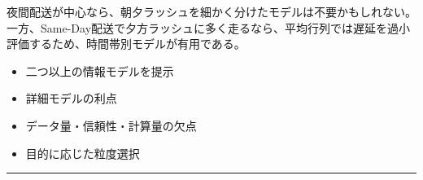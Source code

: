 夜間配送が中心なら、朝夕ラッシュを細かく分けたモデルは不要かもしれない。一方、Same-Day配送で夕方ラッシュに多く走るなら、平均行列では遅延を過小評価するため、時間帯別モデルが有用である。\par
{}
\begin{itemize}
\item 二つ以上の情報モデルを提示
\item 詳細モデルの利点
\item データ量・信頼性・計算量の欠点
\item 目的に応じた粒度選択
\end{itemize}
\vspace{2mm}\hrule\vspace{2mm}

\clearpage
{}
